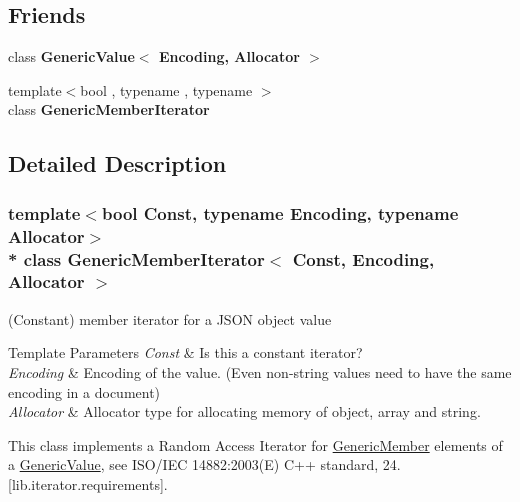 \subsection*{Friends}
\begin{DoxyCompactItemize}
\item 
class {\bfseries Generic\+Value$<$ Encoding, Allocator $>$}\hypertarget{a00118_a82bdd5798f1a5ac0e3e7ba4bd6938cfc}{}\label{a00118_a82bdd5798f1a5ac0e3e7ba4bd6938cfc}

\item 
{\footnotesize template$<$bool , typename , typename $>$ }\\class {\bfseries Generic\+Member\+Iterator}\hypertarget{a00118_aa375aeb1ffac85cddc3a72a6c24ec6e1}{}\label{a00118_aa375aeb1ffac85cddc3a72a6c24ec6e1}

\end{DoxyCompactItemize}


\subsection{Detailed Description}
\subsubsection*{template$<$bool Const, typename Encoding, typename Allocator$>$\\*
class Generic\+Member\+Iterator$<$ Const, Encoding, Allocator $>$}

(Constant) member iterator for a J\+S\+ON object value 


\begin{DoxyTemplParams}{Template Parameters}
{\em Const} & Is this a constant iterator? \\
\hline
{\em Encoding} & Encoding of the value. (Even non-\/string values need to have the same encoding in a document) \\
\hline
{\em Allocator} & Allocator type for allocating memory of object, array and string.\\
\hline
\end{DoxyTemplParams}
This class implements a Random Access Iterator for \hyperlink{a00117}{Generic\+Member} elements of a \hyperlink{a00130}{Generic\+Value}, see I\+S\+O/\+I\+EC 14882\+:2003(E) C++ standard, 24. \mbox{[}lib.\+iterator.\+requirements\mbox{]}.

